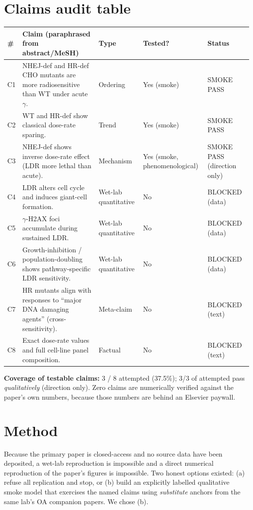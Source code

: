 \documentclass[11pt]{article}
\begin{document}
\section{Claims audit table}

\begin{longtable}{p{0.4cm} p{6.5cm} p{2.2cm} p{1.4cm} p{2.5cm}}
\toprule
\# & Claim (paraphrased from abstract/MeSH) & Type & Tested? & Status \\
\midrule
\endhead
C1 & NHEJ-def and HR-def CHO mutants are more radiosensitive than WT under acute $\gamma$. & Ordering & Yes (smoke) & SMOKE PASS \\
C2 & WT and HR-def show classical dose-rate sparing. & Trend & Yes (smoke) & SMOKE PASS \\
C3 & NHEJ-def shows inverse dose-rate effect (LDR more lethal than acute). & Mechanism & Yes (smoke, phenomenological) & SMOKE PASS (direction only) \\
C4 & LDR alters cell cycle and induces giant-cell formation. & Wet-lab quantitative & No & BLOCKED (data) \\
C5 & $\gamma$-H2AX foci accumulate during sustained LDR. & Wet-lab quantitative & No & BLOCKED (data) \\
C6 & Growth-inhibition / population-doubling shows pathway-specific LDR sensitivity. & Wet-lab quantitative & No & BLOCKED (data) \\
C7 & HR mutants align with responses to ``major DNA damaging agents'' (cross-sensitivity). & Meta-claim & No & BLOCKED (text) \\
C8 & Exact dose-rate values and full cell-line panel composition. & Factual & No & BLOCKED (text) \\
\bottomrule
\end{longtable}

\textbf{Coverage of testable claims:} 3 / 8 attempted (37.5\%); 3/3 of attempted pass
\emph{qualitatively} (direction only). Zero claims are numerically verified against the paper's
own numbers, because those numbers are behind an Elsevier paywall.

\section{Method}

Because the primary paper is closed-access and no source data have been deposited, a wet-lab
reproduction is impossible and a direct numerical reproduction of the paper's figures is
impossible. Two honest options existed: (a) refuse all replication and stop, or (b) build an
explicitly labelled qualitative smoke model that exercises the named claims using
\emph{substitute} anchors from the same lab's OA companion papers. We chose (b).
\end{document}
